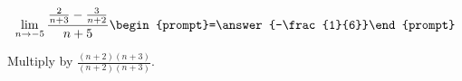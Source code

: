 \documentclass{ximera}
\author{Bart Snapp}
\begin{document}
\begin{exercise}

\[
\lim_{n\to -5 } \frac{\frac{2}{n+3}-\frac{3}{n+2}}{n+5}  \begin{prompt}=\answer{-\frac{1}{6}}\end{prompt}
\]
\begin{hint}
Multiply by $\frac{(n+2) (n+3)}{(n+2) (n+3)}$.
\end{hint}
\end{exercise}
\end{document}
